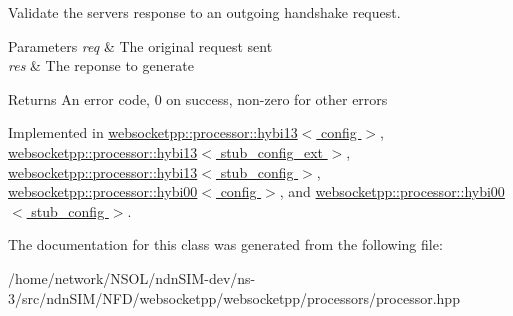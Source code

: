 Validate the server\textquotesingle{}s response to an outgoing handshake request. 


\begin{DoxyParams}{Parameters}
{\em req} & The original request sent \\
\hline
{\em res} & The reponse to generate \\
\hline
\end{DoxyParams}
\begin{DoxyReturn}{Returns}
An error code, 0 on success, non-\/zero for other errors 
\end{DoxyReturn}


Implemented in \hyperlink{classwebsocketpp_1_1processor_1_1hybi13_a8b3cea2f1526b4982e0836c5705584a8}{websocketpp\+::processor\+::hybi13$<$ config $>$}, \hyperlink{classwebsocketpp_1_1processor_1_1hybi13_a8b3cea2f1526b4982e0836c5705584a8}{websocketpp\+::processor\+::hybi13$<$ stub\+\_\+config\+\_\+ext $>$}, \hyperlink{classwebsocketpp_1_1processor_1_1hybi13_a8b3cea2f1526b4982e0836c5705584a8}{websocketpp\+::processor\+::hybi13$<$ stub\+\_\+config $>$}, \hyperlink{classwebsocketpp_1_1processor_1_1hybi00_a8c7e9edc5eec497d908095ab7a848f2e}{websocketpp\+::processor\+::hybi00$<$ config $>$}, and \hyperlink{classwebsocketpp_1_1processor_1_1hybi00_a8c7e9edc5eec497d908095ab7a848f2e}{websocketpp\+::processor\+::hybi00$<$ stub\+\_\+config $>$}.



The documentation for this class was generated from the following file\+:\begin{DoxyCompactItemize}
\item 
/home/network/\+N\+S\+O\+L/ndn\+S\+I\+M-\/dev/ns-\/3/src/ndn\+S\+I\+M/\+N\+F\+D/websocketpp/websocketpp/processors/processor.\+hpp\end{DoxyCompactItemize}
